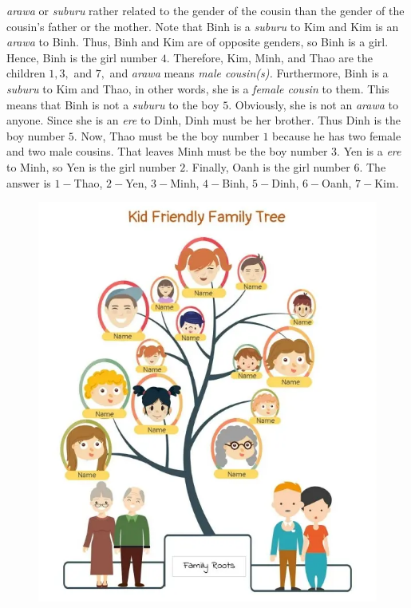 \begin{multicols}{2}
	\textit{arawa} or \textit{suburu} rather related to the gender of the cousin
	than the gender of the cousin's father or the mother.
	Note that Binh is a \textit{suburu} to Kim and Kim is an \textit{arawa} to Binh.
	Thus, Binh and Kim are of opposite genders, so Binh is a girl.
	Hence, Binh is the girl number $4.$
	\vskip 0.1cm
	Therefore, Kim, Minh, and Thao are the children $1, 3,$ and $7,$
	and \textit{arawa} means \textit{male cousin(s).}
	Furthermore, Binh is a \textit{suburu} to Kim and Thao,
	in other words, she is a \textit{female cousin} to them.
	\vskip 0.1cm
	This means that Binh is not a \textit{suburu} to the boy $5.$
	Obviously, she is not an \textit{arawa} to anyone.
	Since she is an \textit{ere} to Dinh, Dinh must be her brother.
	Thus Dinh is the boy number $5.$
	\vskip 0.1cm
	Now, Thao must be the boy number $1$ because he has two female and two male cousins.
	That leaves Minh must be the boy number $3.$
	\vskip 0.1cm
	Yen is a \textit{ere} to Minh, so Yen is the girl number $2.$
	Finally, Oanh is the girl number $6.$
	\vskip 0.1cm
	The answer is $1-$Thao, $2-$Yen, $3-$Minh, $4-$Binh, $5-$Dinh, $6-$Oanh, $7-$Kim.
	\vskip 0.25cm
\end{multicols}
\begin{figure}[H]
	\vspace*{-5pt}
	\centering
	\captionsetup{labelformat= empty, justification=centering}
	\includegraphics[width= 0.65\linewidth]{tree2}
	\vspace*{-5pt}
\end{figure}